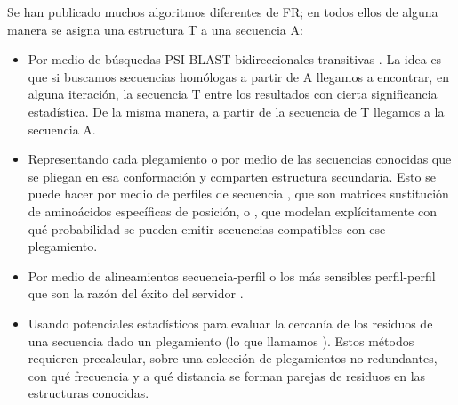 Se han publicado muchos algoritmos diferentes de FR; en todos ellos de alguna manera se asigna una estructura T a una secuencia A:
\begin{itemize}
\item Por medio de b\'{u}squedas PSI-BLAST bidireccionales transitivas \citep{Koretke2002}. 
La idea es que si buscamos secuencias hom\'{o}logas a partir de A llegamos a encontrar, en alguna iteraci\'{o}n, 
la secuencia T entre los resultados con cierta significancia estad\'{i}stica. De la misma manera, a partir de la secuencia de T llegamos a la secuencia A.

\item Representando cada plegamiento o  por medio de las secuencias conocidas que se pliegan en esa conformaci\'{o}n
y comparten estructura secundaria. Esto se puede hacer por medio de perfiles de secuencia \citep{Gribskov1987}, 
que son matrices sustituci\'{o}n de amino\'{a}cidos espec\'{i}ficas de posici\'{o}n, 
o , 
que modelan expl\'{i}citamente con qu\'{e} probabilidad se pueden emitir secuencias compatibles con ese plegamiento.

\item Por medio de alineamientos secuencia-perfil %
o los m\'{a}s sensibles perfil-perfil \citep{Soding2005} %
que son la raz\'{o}n del \'{e}xito del servidor .

\item Usando potenciales estad\'{i}sticos para evaluar la cercan\'{i}a de los residuos de una secuencia
dado un plegamiento (lo que llamamos  \citep{Threader1992}). Estos m\'{e}todos requieren precalcular,
sobre una colecci\'{o}n de plegamientos no redundantes, con qu\'{e} frecuencia y a qu\'{e} distancia se forman 
parejas de residuos en las estructuras conocidas. %



\end{itemize}

